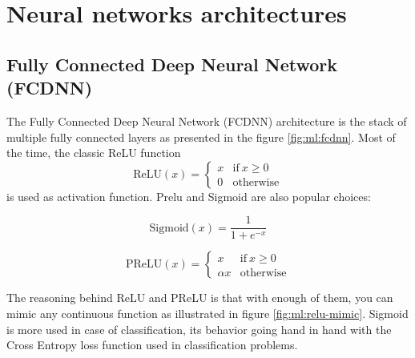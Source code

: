\documentclass[../main.tex]{subfiles}
\begin{document}
\section{Neural networks architectures}
\label{sec:ml:architecture}

\subsection{Fully Connected Deep Neural Network (FCDNN)}
\label{sec:ml:fcdnn}

The Fully Connected Deep Neural Network (FCDNN) architecture is the stack of multiple fully connected layers as presented in the figure \ref{fig:ml:fcdnn}. Most of the time, the classic ReLU function
\begin{equation}
  \label{eq:ml:relu}
  \mathrm{ReLU}(x) = \begin{cases}
    x & \mathrm{if} ~ x \geq 0 \\
    0 & \mathrm{otherwise}
  \end{cases}
\end{equation}
is used as activation function. Prelu and Sigmoid are also popular choices:


\begin{minipage}{0.5\linewidth}
  \begin{equation}
    \label{sec:ml:sigmoid}
    \mathrm{Sigmoid}(x) = \frac{1}{1+ e^{-x}}
  \end{equation}
\end{minipage}
\begin{minipage}{0.5\linewidth}
  \begin{equation}
    \label{sec:ml:prelu}
    \mathrm{PReLU}(x) = \begin{cases}
      x & \mathrm{if} ~ x \geq 0 \\
      \alpha x & \mathrm{otherwise}
    \end{cases}
  \end{equation}
\end{minipage}


The reasoning behind ReLU and PReLU is that with enough of them, you can mimic any continuous function as illustrated in figure \ref{fig:ml:relu-mimic}. Sigmoid is more used in case of classification, its behavior going hand in hand with the Cross Entropy loss function used in classification problems.
\end{document}
